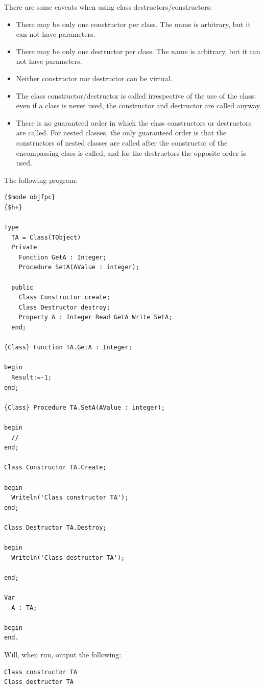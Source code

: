There are some caveats when using class destructors/constructors:
\begin{itemize}
\item There may be only one constructor per class. The name is arbitrary, but it can not have parameters.
\item There may be only one destructor per class. The name is arbitrary, but it can not have parameters.
\item Neither constructor nor destructor can be virtual.
\item The class constructor/destructor is called irrespective of the use of the class: even if a class is never used, the constructor and destructor are called anyway.
\item There is no guaranteed order in which the class constructors or destructors are called.
For nested classes, the only guaranteed order is that the constructors of
nested classes are called after the constructor of the encompassing class is
called, and for the destructors the opposite order is used.
\end{itemize}

The following program:

\begin{verbatim}
{$mode objfpc}
{$h+}

Type
  TA = Class(TObject)
  Private
    Function GetA : Integer;
    Procedure SetA(AValue : integer);

  public
    Class Constructor create;
    Class Destructor destroy;
    Property A : Integer Read GetA Write SetA;
  end;

{Class} Function TA.GetA : Integer;

begin
  Result:=-1;
end;

{Class} Procedure TA.SetA(AValue : integer);

begin
  //
end;

Class Constructor TA.Create;

begin
  Writeln('Class constructor TA');
end;

Class Destructor TA.Destroy;

begin
  Writeln('Class destructor TA');

end;

Var
  A : TA;

begin
end.
\end{verbatim}
Will, when run, output the following:
\begin{verbatim}
Class constructor TA
Class destructor TA
\end{verbatim}


